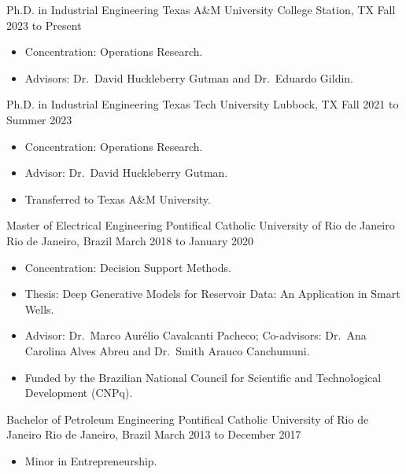 
\cvjob
    {Ph.D. in Industrial Engineering}
    {Texas A\&M University}
    {College Station, TX}
    {Fall 2023 to Present}

\begin{itemize}
    \item Concentration: Operations Research.
    \item Advisors: Dr.\ David Huckleberry Gutman and Dr.\ Eduardo Gildin.
\end{itemize}

\cvjob
    {Ph.D. in Industrial Engineering}
    {Texas Tech University}
    {Lubbock, TX}
    {Fall 2021 to Summer 2023}

\begin{itemize}
    \item Concentration: Operations Research.
    \item Advisor: Dr.\ David Huckleberry Gutman.
    \item Transferred to Texas A\&M University.
\end{itemize}

\cvjob
    {Master of Electrical Engineering}
    {Pontifical Catholic University of Rio de Janeiro}
    {Rio de Janeiro, Brazil}
    {March 2018 to January 2020}

\begin{itemize}
    \item Concentration: Decision Support Methods.
    \item Thesis: Deep Generative Models for Reservoir Data: An Application in Smart Wells.
    \item Advisor: Dr.\ Marco Aurélio Cavalcanti Pacheco;
    Co-advisors: Dr.\ Ana Carolina Alves Abreu and Dr.\ Smith Arauco Canchumuni.
    \item Funded by the Brazilian National Council for Scientific and Technological Development (CNPq).
\end{itemize}

\cvjob
    {Bachelor of Petroleum Engineering}
    {Pontifical Catholic University of Rio de Janeiro}
    {Rio de Janeiro, Brazil}
    {March 2013 to December 2017}

\begin{itemize}
    \item Minor in Entrepreneurship.
\end{itemize}
